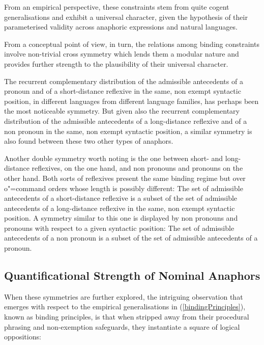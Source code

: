 \documentclass[output=paper
,modfonts
,nonflat]{langsci/langscibook}
\begin{document}
From an empirical perspective, these constraints stem from quite cogent generalisations and exhibit a universal
character, given the hypothesis of their parameterised validity across anaphoric expressions and natural languages.

From a conceptual point of view, in turn, the relations among binding
constraints involve non-trivial cross symmetry which lends them a modular nature
and provides further strength to the plausibility of their universal character.


The recurrent complementary distribution of the admissible antecedents
of a pronoun and of a short-distance reflexive in the same, non exempt
syntactic position, in different languages from different language families,
has perhaps been the most noticeable symmetry. But given also the recurrent complementary 
distribution of the admissible antecedents of a long-distance
reflexive and of a non pronoun in the same, non exempt syntactic position,
a similar symmetry is also found between these two other types of anaphors.

Another double symmetry worth noting is the one
between short- and long-distance reflexives, on the one hand,
and non pronouns and pronouns on the other hand. Both sorts
of reflexives present the same binding regime but over
o"=command orders whose length is possibly different: The set
of admissible antecedents of a short-distance reflexive is a subset
of the set of admissible antecedents of a long-distance reflexive
in the same, non exempt syntactic position. A symmetry similar to
this one is displayed by non pronouns and pronouns with respect
to a given syntactic position: The set of admissible antecedents of
a non pronoun is a subset of the set of admissible antecedents of
a pronoun.

\subsection{Quantificational Strength of Nominal Anaphors \label{quantAnaphor}}

When these symmetries are further explored, 
the intriguing observation that emerges 
with respect to the empirical generalisations in
(\ref{bindingPrinciples}), known as binding principles, is that when stripped away from
their procedural phrasing and non-exemption safeguards,
they instantiate a square of logical oppositions:



\end{document}
